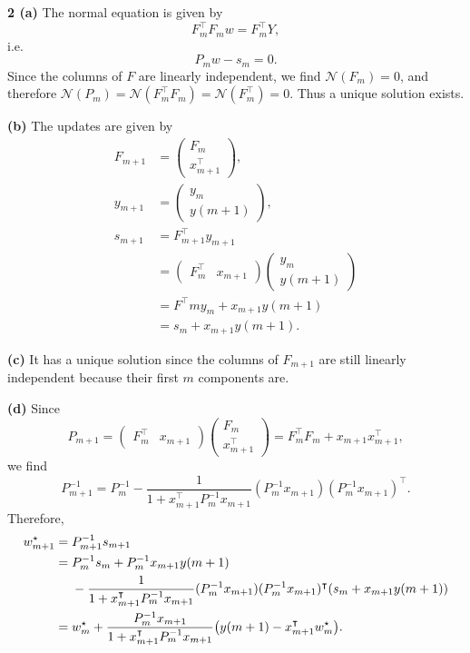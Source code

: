 \documentclass{article}
\makeatletter
\newcommand*{\shifttext}[1]{%
  \settowidth{\@tempdima}{#1}%
  \hspace{-\@tempdima}#1%
}
\newcommand{\plabel}[1]{%
\shifttext{\textbf{#1}\quad}%
}
\newcommand{\prule}{%
\begin{center}%
\hdashrule[0.5ex]{.99\linewidth}{1pt}{1pt 2.5pt}%
\end{center}%
}
\makeatother
\begin{document}
\prule
\plabel{2 (a)}%
The normal equation is given by
\[ F^\intercal_m F_m w = F^\intercal_m Y, \]
i.e.
\[ P_m w - s_m = 0. \]
Since the columns of $F$ are linearly independent, we find $\mathcal{N}(F_m) = \qty{0}$, and therefore $\mathcal{N}(P_m) = \mathcal{N}(F_m^\intercal F_m) = \mathcal{N}(F_m^\intercal) = \qty{0}$.
Thus a unique solution exists.

\plabel{(b)}%
The updates are given by
\begin{align*}
    F_{m+1} &= \begin{pmatrix}
        F_m \\ x^\intercal_{m+1}
    \end{pmatrix}, \\
    y_{m+1} &= \begin{pmatrix}
        y_m \\ y(m+1)
    \end{pmatrix}, \\
    s_{m+1} &= F^\intercal_{m+1} y_{m+1} \\
    &= \begin{pmatrix}
        F^\intercal_m & x_{m+1}
    \end{pmatrix} \begin{pmatrix}
        y_m \\ y(m+1)
    \end{pmatrix} \\
    &= F^\intercal m y_m + x_{m+1} y(m+1) \\
    &= s_m + x_{m+1} y(m+1).
\end{align*}

\plabel{(c)}%
It has a unique solution since the columns of $F_{m+1}$ are still linearly independent because their first $m$ components are.

\plabel{(d)}%
Since
\[ P_{m+1} = \begin{pmatrix}
    F^\intercal_m & x_{m+1}
\end{pmatrix} \begin{pmatrix}
    F_m \\ x^\intercal_{m+1}
\end{pmatrix} = F^\intercal_m F_m + x_{m+1} x^\intercal_{m+1}, \]
we find
\[ P_{m+1}^{-1} = P_m^{-1} - \frac{1}{1+x^\intercal_{m+1} P_m^{-1} x_{m+1}}(P_m^{-1} x_{m+1})(P_m^{-1} x_{m+1})^\intercal. \]
Therefore,
\begin{align*}
    w^\star_{m+1} &= P^{-1}_{m+1} s_{m+1} \\
    &= P^{-1}_m s_m + P^{-1}_{m} x_{m+1}y(m+1) \\
    &\phantom{{}={}} {} - \frac{1}{1+x^\intercal_{m+1} P_m^{-1} x_{m+1}}(P_m^{-1} x_{m+1})(P_m^{-1} x_{m+1})^\intercal (s_m + x_{m+1} y(m+1)) \\
    &= w^\star_m + \frac{P^{-1}_m x_{m+1}}{1+x^\intercal_{m+1} P^{-1}_m x_{m+1}}\qty(y(m+1) - x^\intercal_{m+1}w^\star_m).
\end{align*}
\end{document}
